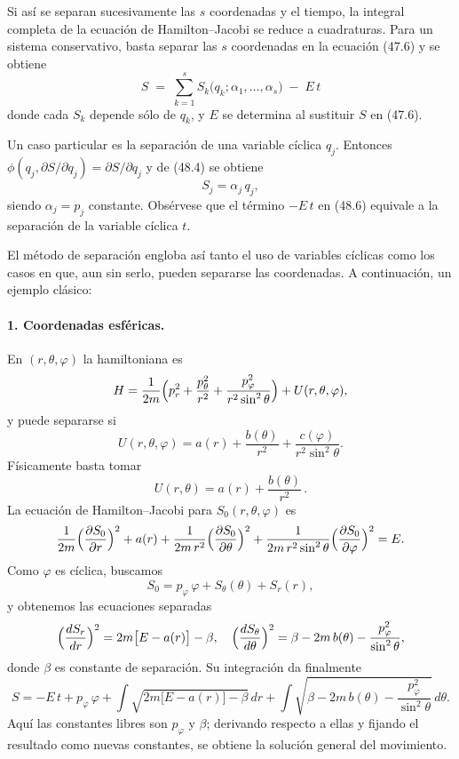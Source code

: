 \documentclass[12pt]{article}
\begin{document}
Si así se separan sucesivamente las \(s\) coordenadas y el tiempo, la integral completa de la ecuación de Hamilton–Jacobi se reduce a cuadraturas. Para un sistema conservativo, basta separar las \(s\) coordenadas en la ecuación (47.6) y se obtiene
\begin{equation}
S \;=\;\sum_{k=1}^{s}S_{k}\bigl(q_{k};\alpha_{1},\dots,\alpha_{s}\bigr)\;-\;E\,t
\tag{48.6}
\end{equation}
donde cada \(S_{k}\) depende sólo de \(q_{k}\), y \(E\) se determina al sustituir \(S\) en (47.6).

Un caso particular es la separación de una variable cíclica \(q_{j}\). Entonces  
\(\phi(q_{j},\partial S/\partial q_{j})=\partial S/\partial q_{j}\)  
y de (48.4) se obtiene  
\begin{equation}
S_{j}=\alpha_{j}\,q_{j},
\tag{48.7}
\end{equation}
siendo \(\alpha_{j}=p_{j}\) constante. Obsérvese que el término \(-E\,t\) en (48.6) equivale a la separación de la variable cíclica \(t\).

El método de separación engloba así tanto el uso de variables cíclicas como los casos en que, aun sin serlo, pueden separarse las coordenadas. A continuación, un ejemplo clásico:

\paragraph{1. Coordenadas esféricas.}
En \((r,\theta,\varphi)\) la hamiltoniana es
\[
H=\frac{1}{2m}\Bigl(p_{r}^{2}+\frac{p_{\theta}^{2}}{r^{2}}
+\frac{p_{\varphi}^{2}}{r^{2}\sin^{2}\theta}\Bigr)
+U(r,\theta,\varphi),
\]
y puede separarse si
\[
U(r,\theta,\varphi)=a(r)+\frac{b(\theta)}{r^{2}}
+\frac{c(\varphi)}{r^{2}\sin^{2}\theta}.
\]
Físicamente basta tomar
\begin{equation}
U(r,\theta)=a(r)+\frac{b(\theta)}{r^{2}}\,.
\tag{48.8}
\end{equation}
La ecuación de Hamilton–Jacobi para \(S_{0}(r,\theta,\varphi)\) es
\[
\frac{1}{2m}\Bigl(\frac{\partial S_{0}}{\partial r}\Bigr)^{2}
+a(r)
+\frac{1}{2m\,r^{2}}\Bigl(\frac{\partial S_{0}}{\partial\theta}\Bigr)^{2}
+\frac{1}{2m\,r^{2}\sin^{2}\theta}\Bigl(\frac{\partial S_{0}}{\partial\varphi}\Bigr)^{2}
=E.
\]
Como \(\varphi\) es cíclica, buscamos
\[
S_{0}=p_{\varphi}\,\varphi+S_{\theta}(\theta)+S_{r}(r),
\]
y obtenemos las ecuaciones separadas
\[
\Bigl(\frac{dS_{r}}{dr}\Bigr)^{2}
=2m\bigl[E-a(r)\bigr]-\beta,
\quad
\Bigl(\frac{dS_{\theta}}{d\theta}\Bigr)^{2}
=\beta-2m\,b(\theta)-\frac{p_{\varphi}^{2}}{\sin^{2}\theta},
\]
donde \(\beta\) es constante de separación. Su integración da finalmente
\begin{equation}
S=-E\,t
+ p_{\varphi}\,\varphi
+\int\sqrt{2m\bigl[E-a(r)\bigr]-\beta}\,dr
+\int\sqrt{\beta-2m\,b(\theta)-\frac{p_{\varphi}^{2}}{\sin^{2}\theta}}\,
d\theta.
\tag{48.9}
\end{equation}
Aquí las constantes libres son \(p_{\varphi}\) y \(\beta\); derivando respecto a ellas y fijando el resultado como nuevas constantes, se obtiene la solución general del movimiento.
\end{document}
